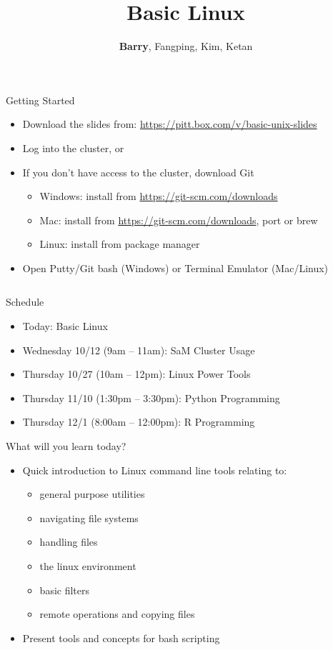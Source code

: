 \documentclass[hyperref={pdfpagelabels=false},12pt]{beamer}
\title[Basic Unix/Linux]{{Basic Linux}}
\author[Basic Unix/Linux]{{\textbf{Barry}, Fangping, Kim, Ketan}}
\date{}
\newcommand{\myvbutton}[2]{\vfill\hyperlink{#1}{\beamerbutton{{#2}}}}
\begin{document}
\begin{frame}[label=started]{Getting Started}
    \begin{itemize}
        \item Download the slides from: \url{https://pitt.box.com/v/basic-unix-slides}
        \item Log into the cluster, or
        \item If you don't have access to the cluster, download Git
        \begin{itemize}
            \item Windows: install from \url{https://git-scm.com/downloads}
            \item Mac: install from \url{https://git-scm.com/downloads}, port or brew
            \item Linux: install from package manager
        \end{itemize}
        \item Open Putty/Git bash (Windows) or Terminal Emulator (Mac/Linux)
    \end{itemize}
\inputminted[bgcolor=lightgray,linenos,fontsize=\scriptsize]{bash}{code/getting-started.txt}
\myvbutton{navigate}{a clickable button}
\end{frame}

\begin{frame}[plain]
\titlepage
\end{frame}

\begin{frame}{Schedule}
\begin{itemize}
    \item Today: Basic Linux
    \item Wednesday 10/12 (9am -- 11am): SaM Cluster Usage
    \item Thursday 10/27 (10am -- 12pm): Linux Power Tools
    \item Thursday 11/10 (1:30pm -- 3:30pm): Python Programming
    \item Thursday 12/1 (8:00am -- 12:00pm): R Programming
\end{itemize}
\end{frame}

\begin{frame}{What will you learn today?}
    \begin{itemize}
        \item Quick introduction to Linux command line tools relating to:
        \begin{itemize}
            \item general purpose utilities
            \item navigating file systems
            \item handling files
            \item the linux environment
            \item basic filters
            \item remote operations and copying files
        \end{itemize}
        \item Present tools and concepts for bash scripting
    \end{itemize}
\end{frame}
\end{document}
